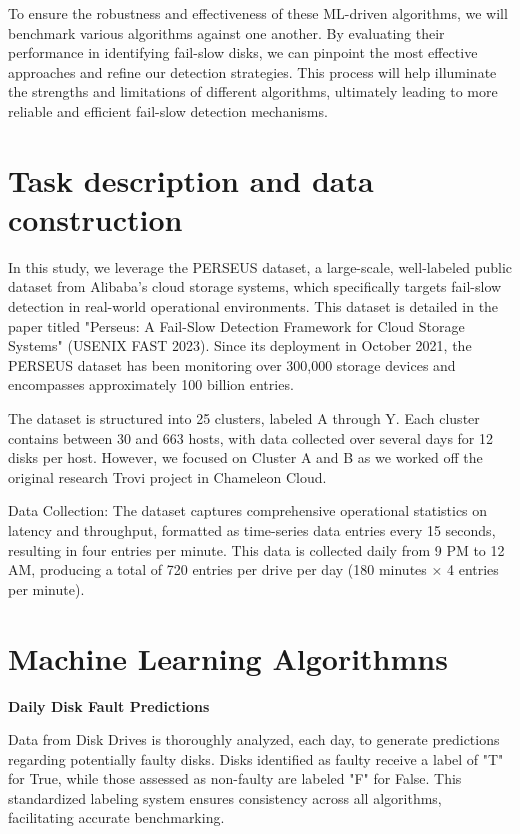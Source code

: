 \documentclass{article}
\begin{document}
\quad To ensure the robustness and effectiveness of these ML-driven algorithms, we will benchmark various algorithms against one another. By evaluating their performance in identifying fail-slow disks, we can pinpoint the most effective approaches and refine our detection strategies. This process will help illuminate the strengths and limitations of different algorithms, ultimately leading to more reliable and efficient fail-slow detection mechanisms.


\section{Task description and data construction}
\label{sec:headings}

\quad In this study, we leverage the PERSEUS dataset, a large-scale, well-labeled public dataset from Alibaba's cloud storage systems, which specifically targets fail-slow detection in real-world operational environments. This dataset is detailed in the paper titled "Perseus: A Fail-Slow Detection Framework for Cloud Storage Systems" (USENIX FAST 2023). Since its deployment in October 2021, the PERSEUS dataset has been monitoring over 300,000 storage devices and encompasses approximately 100 billion entries. 

\quad The dataset is structured into 25 clusters, labeled A through Y. Each cluster contains between 30 and 663 hosts, with data collected over several days for 12 disks per host. However, we focused on Cluster A and B as we worked off the original research Trovi project in Chameleon Cloud.

\quad Data Collection: The dataset captures comprehensive operational statistics on latency and throughput, formatted as time-series data entries every 15 seconds, resulting in four entries per minute. This data is collected daily from 9 PM to 12 AM, producing a total of 720 entries per drive per day (180 minutes × 4 entries per minute). 

\section{Machine Learning Algorithmns}

\textbf{Daily Disk Fault Predictions}

\quad Data from Disk Drives is thoroughly analyzed, each day, to generate predictions regarding potentially faulty disks. Disks identified as faulty receive a label of "T" for True, while those assessed as non-faulty are labeled "F" for False. This standardized labeling system ensures consistency across all algorithms, facilitating accurate benchmarking.
\end{document}
